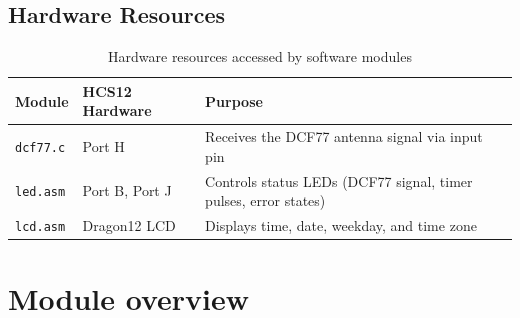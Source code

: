 \documentclass[a4paper,12pt]{article}
\begin{document}

\subsection{Hardware Resources}

\begin{table}[H]
\centering
\renewcommand{\arraystretch}{1.3}
\begin{tabularx}{\textwidth}{|L{3cm}|L{3.5cm}|X|}
\hline
\textbf{Module} & \textbf{HCS12 Hardware} & \textbf{Purpose} \\
\hline
\texttt{dcf77.c} & Port H & Receives the DCF77 antenna signal via input pin \\
\hline
\texttt{led.asm} & Port B, Port J & Controls status LEDs (DCF77 signal, timer pulses, error states) \\
\hline
\texttt{lcd.asm} & Dragon12 LCD & Displays time, date, weekday, and time zone \\
\hline
\end{tabularx}
\caption{Hardware resources accessed by software modules}
\end{table}

\newpage


\section{Module overview}
\end{document}
